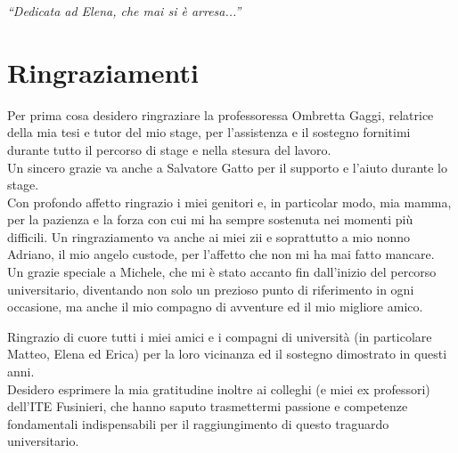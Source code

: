 \cleardoublepage
{}
{}

\begin{flushright}{
    \slshape
    ``Dedicata ad Elena, che mai si è arresa...''} \\
\end{flushright}

\begingroup
\let\clearpage\relax
\let\cleardoublepage\relax

\chapter*{Ringraziamenti}
\noindent\begin{small}Per prima cosa desidero ringraziare la professoressa Ombretta Gaggi, relatrice della mia tesi e tutor del mio stage, per l’assistenza e il sostegno fornitimi durante tutto il percorso di stage e nella stesura del lavoro.\\
Un sincero grazie va anche a Salvatore Gatto per il supporto e l’aiuto durante lo stage.\\

\noindent Con profondo affetto ringrazio i miei genitori e, in particolar modo, mia mamma, per la pazienza e la forza con cui mi ha sempre sostenuta nei momenti più difficili. Un ringraziamento va anche ai miei zii e soprattutto a mio nonno Adriano, il mio angelo custode, per l’affetto che non mi ha mai fatto mancare.\\

\noindent Un grazie speciale a Michele, che mi è stato accanto fin dall’inizio del percorso universitario, diventando non solo un prezioso punto di riferimento in ogni occasione, ma anche il mio compagno di avventure ed il mio migliore amico.

\noindent Ringrazio di cuore tutti i miei amici e i compagni di università (in particolare Matteo, Elena ed Erica) per la loro vicinanza ed il sostegno dimostrato in questi anni.\\

\noindent Desidero esprimere la mia gratitudine inoltre ai colleghi (e miei ex professori) dell’ITE Fusinieri, che hanno saputo trasmettermi passione e competenze fondamentali indispensabili per il raggiungimento di questo traguardo universitario.\\
\end{small}
\vspace{0.75cm}

\noindent{\myLocation, \myTime}
\hfill \textit{\myName}

\endgroup